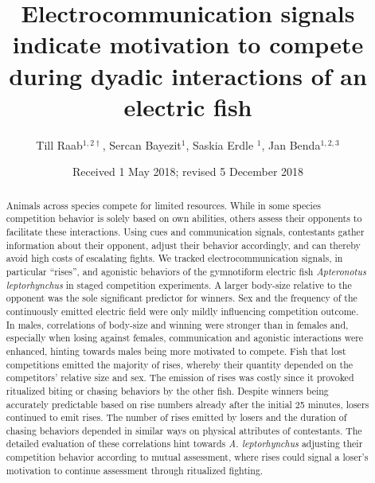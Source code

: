 \documentclass[vruler,JEB]{COB}%
\newcommand{\Lepto}{\textit{Apteronotus leptorhynchus}}
\newcommand{\lepto}{\textit{A. leptorhynchus}}
\begin{document}

\title{Electrocommunication signals indicate motivation to compete during dyadic interactions of an electric fish}

\author{Till Raab$^{1,2\dagger}$, Sercan Bayezit$^{1}$, Saskia Erdle $^{1}$, Jan Benda$^{1,2,3}$}

\address{
}


\date{Received 1 May 2018; revised 5 December 2018}

\maketitle

\begin{abstract}
Animals across species compete for limited resources. While in some species competition behavior is solely based on own abilities, others assess their opponents to facilitate these interactions. Using cues and communication signals, contestants gather information about their opponent, adjust their behavior accordingly, and can thereby avoid high costs of escalating fights. We tracked electrocommunication signals, in particular ``rises'', and agonistic behaviors of the gymnotiform electric fish \Lepto{} in staged competition experiments. A larger body-size relative to the opponent was the sole significant predictor for winners. Sex and the frequency of the continuously emitted electric field were only mildly influencing competition outcome. In males, correlations of body-size and winning were stronger than in females and, especially when losing against females, communication and agonistic interactions were enhanced, hinting towards males being more motivated to compete. Fish that lost competitions emitted the majority of rises, whereby their quantity depended on the competitors' relative size and sex. The emission of rises was costly since it provoked ritualized biting or chasing behaviors by the other fish. Despite winners being accurately predictable based on rise numbers already after the initial 25 minutes, losers continued to emit rises. The number of rises emitted by losers and the duration of chasing behaviors depended in similar ways on physical attributes of contestants. The detailed evaluation of these correlations hint towards \lepto{} adjusting their competition behavior according to mutual assessment, where rises could signal a loser's motivation to continue assessment through ritualized fighting. 
\end{abstract}
\end{document}
